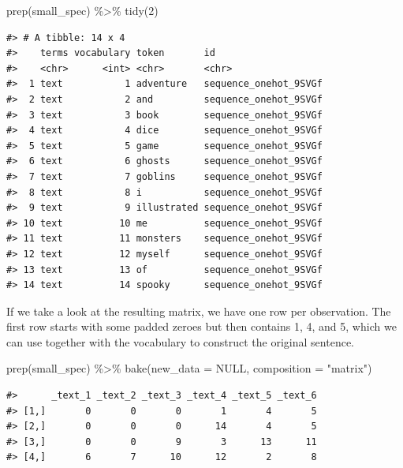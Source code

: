 \documentclass[
]{krantz}
\makeatletter
\newenvironment{Shaded}{\begin{snugshade}}{\end{snugshade}}
\newcommand{\AttributeTok}[1]{\textcolor[rgb]{0.77,0.63,0.00}{#1}}
\newcommand{\ConstantTok}[1]{\textcolor[rgb]{0.00,0.00,0.00}{#1}}
\newcommand{\DecValTok}[1]{\textcolor[rgb]{0.00,0.00,0.81}{#1}}
\newcommand{\FunctionTok}[1]{\textcolor[rgb]{0.00,0.00,0.00}{#1}}
\newcommand{\NormalTok}[1]{#1}
\newcommand{\SpecialCharTok}[1]{\textcolor[rgb]{0.00,0.00,0.00}{#1}}
\newcommand{\StringTok}[1]{\textcolor[rgb]{0.31,0.60,0.02}{#1}}
\newenvironment{kframe}{%
\medskip{}
\setlength{\fboxsep}{.8em}
 \def\at@end@of@kframe{}%
 \ifinner\ifhmode%
  \def\at@end@of@kframe{\end{minipage}}%
  \begin{minipage}{\columnwidth}%
 \fi\fi%
 \def\FrameCommand##1{\hskip\@totalleftmargin \hskip-\fboxsep
 \colorbox{shadecolor}{##1}\hskip-\fboxsep
     \hskip-\linewidth \hskip-\@totalleftmargin \hskip\columnwidth}%
 \MakeFramed {\advance\hsize-\width
   \@totalleftmargin\z@ \linewidth\hsize
   \@setminipage}}%
 {\par\unskip\endMakeFramed%
 \at@end@of@kframe}
\renewenvironment{Shaded}{\begin{kframe}}{\end{kframe}}
\makeatother
\begin{document}
\begin{Shaded}
\begin{Highlighting}[]
\FunctionTok{prep}\NormalTok{(small\_spec) }\SpecialCharTok{\%\textgreater{}\%}
  \FunctionTok{tidy}\NormalTok{(}\DecValTok{2}\NormalTok{)}
\end{Highlighting}
\end{Shaded}

\begin{verbatim}
#> # A tibble: 14 x 4
#>    terms vocabulary token       id                   
#>    <chr>      <int> <chr>       <chr>                
#>  1 text           1 adventure   sequence_onehot_9SVGf
#>  2 text           2 and         sequence_onehot_9SVGf
#>  3 text           3 book        sequence_onehot_9SVGf
#>  4 text           4 dice        sequence_onehot_9SVGf
#>  5 text           5 game        sequence_onehot_9SVGf
#>  6 text           6 ghosts      sequence_onehot_9SVGf
#>  7 text           7 goblins     sequence_onehot_9SVGf
#>  8 text           8 i           sequence_onehot_9SVGf
#>  9 text           9 illustrated sequence_onehot_9SVGf
#> 10 text          10 me          sequence_onehot_9SVGf
#> 11 text          11 monsters    sequence_onehot_9SVGf
#> 12 text          12 myself      sequence_onehot_9SVGf
#> 13 text          13 of          sequence_onehot_9SVGf
#> 14 text          14 spooky      sequence_onehot_9SVGf
\end{verbatim}

If we take a look at the resulting matrix, we have one row per observation. The first row starts with some padded zeroes but then contains 1, 4, and 5, which we can use together with the vocabulary to construct the original sentence.

\begin{Shaded}
\begin{Highlighting}[]
\FunctionTok{prep}\NormalTok{(small\_spec) }\SpecialCharTok{\%\textgreater{}\%}
  \FunctionTok{bake}\NormalTok{(}\AttributeTok{new\_data =} \ConstantTok{NULL}\NormalTok{, }\AttributeTok{composition =} \StringTok{"matrix"}\NormalTok{)}
\end{Highlighting}
\end{Shaded}

\begin{verbatim}
#>      _text_1 _text_2 _text_3 _text_4 _text_5 _text_6
#> [1,]       0       0       0       1       4       5
#> [2,]       0       0       0      14       4       5
#> [3,]       0       0       9       3      13      11
#> [4,]       6       7      10      12       2       8
\end{verbatim}
\end{document}
